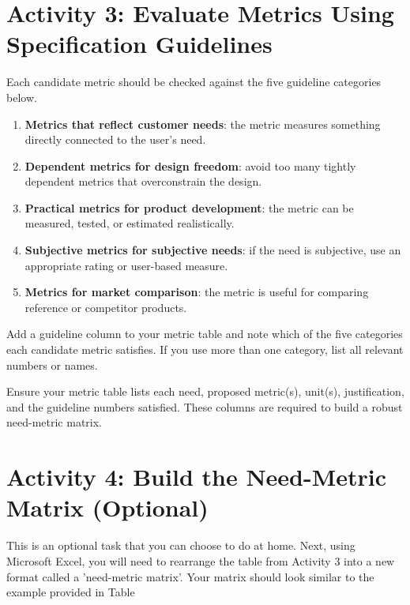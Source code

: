 \section{Activity 3: Evaluate Metrics Using Specification Guidelines}

Each candidate metric should be checked against the five guideline categories below.

\begin{enumerate}
    \item \textbf{Metrics that reflect customer needs}: the metric measures something directly connected to the user's need.
    \item \textbf{Dependent metrics for design freedom}: avoid too many tightly dependent metrics that overconstrain the design.
    \item \textbf{Practical metrics for product development}: the metric can be measured, tested, or estimated realistically.
    \item \textbf{Subjective metrics for subjective needs}: if the need is subjective, use an appropriate rating or user-based measure.
    \item \textbf{Metrics for market comparison}: the metric is useful for comparing reference or competitor products.
\end{enumerate}

Add a guideline column to your metric table and note which of the five categories each candidate metric satisfies. If you use more than one category, list all relevant numbers or names.

\begin{tcolorbox}[title=Checkpoint]
Ensure your metric table lists each need, proposed metric(s), unit(s), justification, and the guideline numbers satisfied. These columns are required to build a robust need-metric matrix.
\end{tcolorbox}

\section{Activity 4: Build the Need-Metric Matrix (Optional)}

This is an optional task that you can choose to do at home. Next, using Microsoft Excel, you will need to rearrange the table from Activity 3 into a new format called a 'need-metric matrix'. Your matrix should look similar to the example provided in Table 



